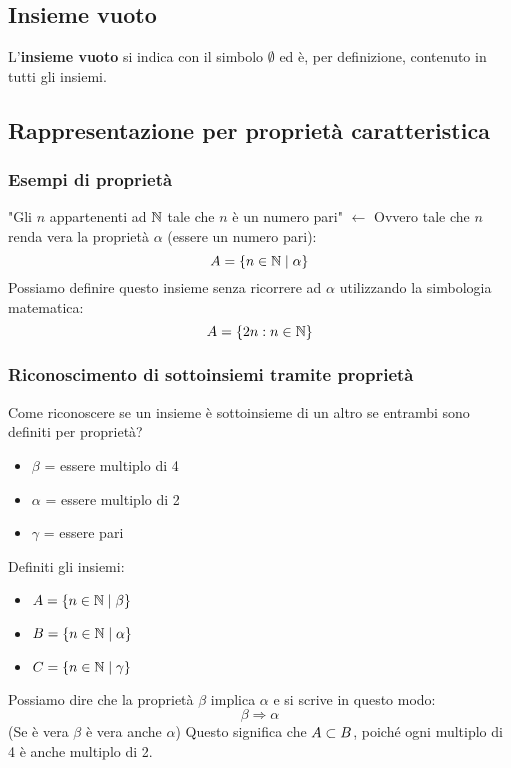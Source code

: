 \subsection{Insieme vuoto}
L'\textbf{insieme vuoto} si indica con il simbolo $\emptyset$ ed è, per definizione, contenuto in tutti gli insiemi.

\subsection{Rappresentazione per proprietà caratteristica}


\subsubsection{Esempi di proprietà}
"Gli $n$ appartenenti ad $\mathbb{N}$ tale che $n$ è un numero pari" $\leftarrow$ Ovvero tale che $n$ renda vera la proprietà $\alpha$ (essere un numero pari):
\[
A = \{n \in \mathbb{N} \mid \alpha\}
\]
Possiamo definire questo insieme senza ricorrere ad $\alpha$ utilizzando la simbologia matematica:
\[
A = \{2n : n \in \mathbb{N}\}
\]


\subsubsection{Riconoscimento di sottoinsiemi tramite proprietà}
Come riconoscere se un insieme è sottoinsieme di un altro se entrambi sono definiti per proprietà?
\begin{itemize}
    \item $\beta$ = essere multiplo di 4
    \item $\alpha$ = essere multiplo di 2
    \item $\gamma$ = essere pari
\end{itemize}

Definiti gli insiemi:
\begin{itemize}
    \item $A = \{n \in \mathbb{N} \mid \beta\}$
    \item $B = \{n \in \mathbb{N} \mid \alpha\}$
    \item $C = \{n \in \mathbb{N} \mid \gamma\}$
\end{itemize}

Possiamo dire che la proprietà $\beta$ implica $\alpha$ e si scrive in questo modo:
\[
\beta \Rightarrow \alpha
\]
(Se è vera $\beta$ è vera anche $\alpha$)
Questo significa che $A \subset B$, poiché ogni multiplo di 4 è anche multiplo di 2.

